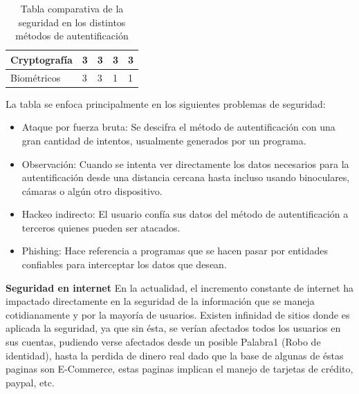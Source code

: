 \documentclass[12pt, a4paper, titlepage]{report}
\begin{document}
\begin{table}[H]
{\begin{tabular}{l|l|l|l|l|}
					\multicolumn{1}{|l|}{Cryptografía}                                                     & 3                                                                 & 3           & 3                                                          & 3        \\ \hline
					\multicolumn{1}{|l|}{Biométricos}                                                      & 3                                                                 & 3           & 1                                                          & 1        \\ \hline
				\end{tabular}
			}
			\caption[Seguridad en los métodos de autentificación]{Tabla comparativa de la seguridad en los distintos métodos de autentificaci\'on}
			\label{cuadro:VentajasMetodos}
		\end{table}
		La tabla se enfoca principalmente en los siguientes problemas de seguridad: 
		
		\begin{itemize}
			\item Ataque por fuerza bruta: Se descifra el método de autentificaci\'on con una gran cantidad de intentos, usualmente generados por un programa.
			\item Observación: Cuando se intenta ver directamente los datos necesarios para la autentificaci\'on desde una distancia cercana hasta incluso usando binoculares, cámaras o algún otro dispositivo.
			\item Hackeo indirecto: El usuario confía sus datos del método de autentificaci\'on a terceros quienes pueden ser atacados. 
			\item Phishing: Hace referencia a programas que se hacen pasar por entidades confiables para interceptar los datos que desean.
		\end{itemize}
		
	    \textbf{Seguridad en internet}
	    En la actualidad, el incremento constante de internet ha impactado directamente en la seguridad de la información que se maneja cotidianamente y por la mayoría de usuarios. Existen infinidad de sitios donde es aplicada la seguridad, ya que sin ésta, se verían afectados todos los usuarios en  sus cuentas, pudiendo verse afectados desde un posible \Gls{Palabra1} (Robo de identidad), hasta la perdida de dinero real dado que la base de algunas de éstas paginas son E-Commerce, estas paginas implican el manejo de tarjetas de crédito, paypal, etc.\\
		
\end{document}
